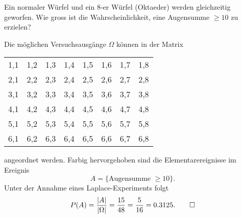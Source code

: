 Ein normaler Würfel und ein 8-er Würfel (Oktaeder) werden gleichzeitig
geworfen. 
Wie gross ist die Wahrscheinlichkeit, eine Augensumme $\ge 10$ zu erzielen?


\begin{loesung}
Die möglichen Versuchsausgänge $\Omega$ können in der Matrix
\begin{center}
\begin{tabular}{|cccccccc|}
\hline
1,1&1,2&1,3&1,4&1,5&1,6&1,7&1,8\\
2,1&2,2&2,3&2,4&2,5&2,6&2,7&\color{red}2,8\\
3,1&3,2&3,3&3,4&3,5&3,6&\color{red}3,7&\color{red}3,8\\
4,1&4,2&4,3&4,4&4,5&\color{red}4,6&\color{red}4,7&\color{red}4,8\\
5,1&5,2&5,3&5,4&\color{red}5,5&\color{red}5,6&\color{red}5,7&\color{red}5,8\\
6,1&6,2&6,3&\color{red}6,4&\color{red}6,5&\color{red}6,6&\color{red}6,7&\color{red}6,8\\
\hline
\end{tabular}
\end{center}
angeordnet werden.
Farbig hervorgehoben sind die Elementarereignisse im Ereignis
\[
A=\{\text{Augensumme $\ge 10$}\}.
\]
Unter der Annahme eines Laplace-Experiments folgt
\[
P(A)=\frac{|A|}{|\Omega|}=\frac{15}{48}=\frac{5}{16}=0.3125.
\qedhere
\]
\end{loesung}

